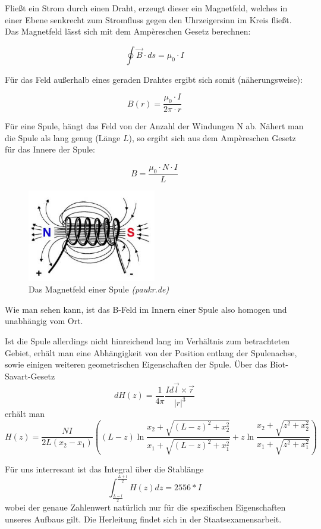 Fließt ein Strom durch einen Draht, erzeugt dieser ein Magnetfeld, welches in einer Ebene senkrecht zum Stromfluss gegen den Uhrzeigersinn im Kreis fließt. Das Magnetfeld lässt sich mit dem Ampèreschen Gesetz berechnen:

\begin{equation} \oint \vec B \cdot ds = \mu_0\cdot I \end{equation}

Für das Feld außerhalb eines geraden Drahtes ergibt sich somit (näherungsweise):

$$B(r) = \frac{\mu_0\cdot I}{2\pi\cdot r} $$

Für eine Spule, hängt das Feld von der Anzahl der Windungen N ab. Nähert man die Spule als lang genug (Länge $L$), so ergibt sich aus dem Ampèreschen Gesetz für das Innere der Spule:

\begin{equation} B = \frac{\mu_0\cdot N\cdot I}{L} \end{equation}


\begin{figure}[H]
	\centering \includegraphics[width = 0.5\textwidth]{Bilder/Spule.jpg}
	\caption{Das Magnetfeld einer Spule \emph{(paukr.de)}}
\end{figure}

Wie man sehen kann, ist das B-Feld im Innern einer Spule also homogen und unabhängig vom Ort.

Ist die Spule allerdings nicht hinreichend lang im Verhältnis zum betrachteten Gebiet, erhält man eine Abhängigkeit von der Position entlang der Spulenachse, sowie einigen weiteren geometrischen Eigenschaften der Spule. Über das Biot-Savart-Gesetz
$$  dH\left( z \right) = \frac{1}{4 \pi} \frac{I d\vec{l} \times \vec{r}}{\left|r\right|^3} $$
erhält man
$$ H \left( z \right) = \frac{N I}{2 L \left( x_2 - x_1 \right)} \left( \left( L - z \right) \ln \frac{x_2 + \sqrt{\left( L-z \right)^2 + x_2^2}}{x_1 + \sqrt{\left( L - z \right)^2 + x_1^2}} + z \ln \frac{x_2 + \sqrt{z^2 + x_2^2}}{x_1 + \sqrt{z^2 + x_1^2}}  \right) $$

Für uns interresant ist das Integral über die Stablänge
$$ \int_{\frac{L-l}{2}}^{\frac{L+l}{2}} H\left( z \right) dz = 2556*I $$
wobei der genaue Zahlenwert natürlich nur für die spezifischen Eigenschaften unseres Aufbaus gilt. Die Herleitung findet sich in der Staatsexamensarbeit.

\clearpage